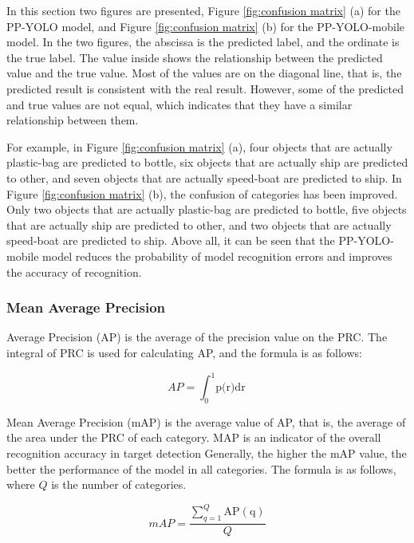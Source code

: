 \documentclass[sensors,article,submit,moreauthors,pdftex]{Definitions/mdpi}
\begin{document}
\begin{paracol}{2}
In this section two figures are presented, Figure \ref{fig:confusion matrix} (a) for the PP-YOLO model, and Figure \ref{fig:confusion matrix} (b) for the PP-YOLO-mobile model. In the two figures, the abscissa is the predicted label, and the ordinate is the true label. The value inside shows the relationship between the predicted value and the true value. Most of the values are on the diagonal line, that is, the predicted result is consistent with the real result. However, some of the predicted and true values are not equal, which indicates that they have a similar relationship between them.

For example, in Figure \ref{fig:confusion matrix} (a), four objects that are actually plastic-bag are predicted to bottle, six objects that are actually ship are predicted to other, and seven objects that are actually speed-boat are predicted to ship. In Figure \ref{fig:confusion matrix} (b), the confusion of categories has been improved. Only two objects that are actually plastic-bag are predicted to bottle, five objects that are actually ship are predicted to other, and two objects that are actually speed-boat are predicted to ship. Above all, it can be seen that the PP-YOLO-mobile model reduces the probability of model recognition errors and improves the accuracy of recognition.





\subsubsection{Mean Average Precision}
Average Precision (AP) is the average of the precision value on the PRC. The integral of PRC is used for calculating AP, and the formula is as follows:

\begin{equation} 
{AP} = {\int_{0}^{1}\text{p(r)dr}} 
\end{equation}

Mean Average Precision (mAP) is the average value of AP, that is, the average of the area under the PRC of each category. MAP is an indicator of the overall recognition accuracy in target detection Generally, the higher the mAP value, the better the performance of the model in all categories. The formula is as follows, where $Q$ is the number of categories.

\begin{equation} 
{mAP} = {\frac {\sum _{q=1}^{Q}\operatorname {AP(q)} }{Q}}
\end{equation}


\end{paracol}
\end{document}

